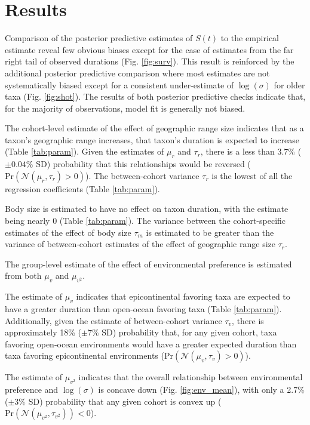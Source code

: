 \documentclass{article}
\begin{document}
\section{Results}

Comparison of the posterior predictive estimates of \(S(t)\) to the empirical estimate reveal few obvious biases except for the case of estimates from the far right tail of observed durations (Fig. \ref{fig:surv}). This result is reinforced by the additional posterior predictive comparison where most estimates are not systematically biased except for a consistent under-estimate of \(\log(\sigma)\) for older taxa (Fig. \ref{fig:shot}). The results of both posterior predictive checks indicate that, for the majority of observations, model fit is generally not biased.

The cohort-level estimate of the effect of geographic range size indicates that as a taxon's geographic range increases, that taxon's duration is expected to increase (Table \ref{tab:param}). Given the estimates of \(\mu_{r}\) and \(\tau_{r}\), there is a less than 3.7\% (\(\pm 0.04\%\) SD) probability that this relationships would be reversed (\(\mathrm{Pr}\left(\mathcal{N}(\mu_{r}, \tau_{r}) > 0\right)\)). The between-cohort variance \(\tau_{r}\) is the lowest of all the regression coefficients (Table \ref{tab:param}).

Body size is estimated to have no effect on taxon duration, with the estimate being nearly 0 (Table \ref{tab:param}). The variance between the cohort-specific estimates of the effect of body size \(\tau_{m}\) is estimated to be greater than the variance of between-cohort estimates of the effect of geographic range size \(\tau_{r}\). 

The group-level estimate of the effect of environmental preference is estimated from both \(\mu_{v}\) and \(\mu_{v^{2}}\). 

The estimate of \(\mu_{v}\) indicates that epicontinental favoring taxa are expected to have a greater duration than open-ocean favoring taxa (Table \ref{tab:param}). Additionally, given the estimate of between-cohort variance \(\tau_{v}\), there is approximately 18\% (\(\pm 7\%\) SD) probability that, for any given cohort, taxa favoring open-ocean environments would have a greater expected duration than taxa favoring epicontinental environments (\(\mathrm{Pr}\left(\mathcal{N}(\mu_{v}, \tau_{v}) > 0 \right)\)). 

The estimate of \(\mu_{v^{2}}\) indicates that the overall relationship between environmental preference and \(\log(\sigma)\) is concave down (Fig. \ref{fig:env_mean}), with only a 2.7\% (\(\pm 3\%\) SD) probability that any given cohort is convex up (\(\mathrm{Pr}\left(\mathcal{N}(\mu_{v^{2}}, \tau_{v^{2}})\right) < 0\)).
\end{document}
